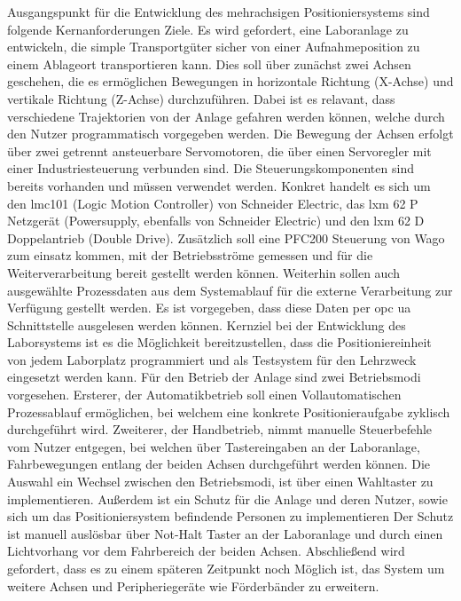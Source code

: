 \documentclass[../Bachelorarbeit.tex]{subfiles}
\begin{document}
Ausgangspunkt für die Entwicklung des mehrachsigen Positioniersystems sind folgende Kernanforderungen \bzw Ziele. Es wird gefordert, eine Laboranlage zu entwickeln, die simple Transportgüter sicher von einer Aufnahmeposition zu einem Ablageort transportieren kann. Dies soll über zunächst zwei Achsen geschehen, die es ermöglichen Bewegungen in horizontale Richtung (X-Achse) und vertikale Richtung (Z-Achse) durchzuführen. Dabei ist es relavant, dass verschiedene Trajektorien von der Anlage gefahren werden können, welche durch den Nutzer programmatisch vorgegeben werden. Die Bewegung der Achsen erfolgt über zwei getrennt ansteuerbare Servomotoren, die über einen Servoregler mit einer Industriesteuerung verbunden sind. Die Steuerungskomponenten sind bereits vorhanden und müssen verwendet werden. Konkret handelt es sich um den \acs{lmc}101 (Logic Motion Controller) von Schneider Electric, das \acs{lxm} 62 P Netzgerät (\eng Powersupply, ebenfalls von Schneider Electric) und den \acs{lxm} 62 D Doppelantrieb (\eng Double Drive). Zusätzlich soll eine PFC200 Steuerung von Wago zum einsatz kommen, mit der Betriebsströme gemessen und für die Weiterverarbeitung bereit gestellt werden können. Weiterhin sollen auch ausgewählte Prozessdaten aus dem Systemablauf für die externe Verarbeitung zur Verfügung gestellt werden. Es ist vorgegeben, dass diese Daten per \ac{opc} \ac{ua} Schnittstelle ausgelesen werden können. Kernziel bei der Entwicklung des Laborsystems ist es die Möglichkeit bereitzustellen, dass die Positioniereinheit von jedem Laborplatz programmiert und als Testsystem für den Lehrzweck eingesetzt werden kann. Für den Betrieb der Anlage sind zwei Betriebsmodi vorgesehen. Ersterer, der Automatikbetrieb soll einen Vollautomatischen Prozessablauf ermöglichen, bei welchem eine konkrete Positionieraufgabe zyklisch durchgeführt wird. Zweiterer, der Handbetrieb, nimmt manuelle Steuerbefehle vom Nutzer entgegen, bei welchen über Tastereingaben an der Laboranlage, Fahrbewegungen entlang der beiden Achsen durchgeführt werden können. Die Auswahl \bzw ein Wechsel zwischen den Betriebsmodi, ist über einen Wahltaster zu implementieren. Außerdem ist ein Schutz für die Anlage und deren Nutzer, sowie sich um das Positioniersystem befindende Personen zu implementieren Der Schutz ist manuell auslösbar über Not-Halt Taster an der Laboranlage und durch einen Lichtvorhang vor dem Fahrbereich der beiden Achsen. Abschließend wird gefordert, dass es zu einem späteren Zeitpunkt noch Möglich ist, das System um weitere Achsen und Peripheriegeräte wie \bspw Förderbänder zu erweitern. %
\end{document}
